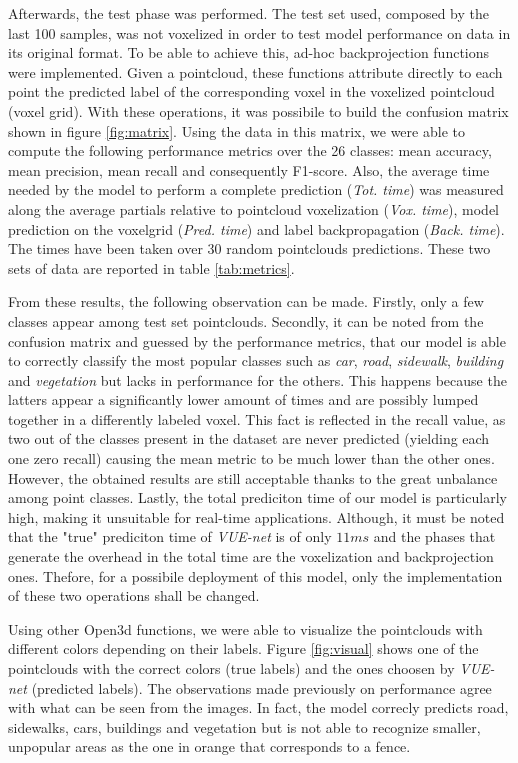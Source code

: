 Afterwards, the test phase was performed. The test set used, composed by the last 100 samples, 
was not voxelized in order to test model performance on data in its original format.
To be able to achieve this, ad-hoc backprojection functions were implemented.
Given a pointcloud, these functions attribute directly to each point the predicted label of the
corresponding voxel in the voxelized pointcloud (voxel grid).
With these operations, it was possibile to build the confusion matrix shown in figure \ref{fig:matrix}.
Using the data in this matrix, we were able to compute the following performance metrics over the 26 classes: 
mean accuracy, mean precision, mean recall and consequently F1-score.
Also, the average time needed by the model to perform a complete prediction (\textit{Tot. time}) was measured along the average partials relative to
pointcloud voxelization (\textit{Vox. time}), model prediction on the voxelgrid (\textit{Pred. time}) and
label backpropagation (\textit{Back. time}). The times have been taken over 30 random pointclouds predictions.
These two sets of data are reported in table \ref{tab:metrics}.

From these results, the following observation can be made.
Firstly, only a few classes appear among test set pointclouds.
Secondly, it can be noted from the confusion matrix and guessed by the performance metrics, 
that our model is able to correctly classify the most popular classes such as \textit{car},
\textit{road}, \textit{sidewalk}, \textit{building} and \textit{vegetation} 
but lacks in performance for the others. 
This happens because the latters appear a significantly lower amount of times and are possibly lumped together in a differently labeled voxel. 
This fact is reflected in the recall value, as two out of the classes present in the dataset 
are never predicted (yielding each one zero recall) causing the mean metric to be much lower than the other ones.
However, the obtained results are still acceptable thanks to the great unbalance among point classes.
Lastly, the total prediciton time of our model is particularly high,
making it unsuitable for real-time applications. Although, it must be noted that the "true" prediciton time
of \textit{VUE-net} is of only $11ms$ and the phases that generate the overhead in the total time
are the voxelization and backprojection ones. Thefore, for a possibile deployment of this model, only the 
implementation of these two operations shall be changed.

Using other Open3d functions, we were able to visualize the pointclouds with different colors depending
on their labels. Figure \ref{fig:visual} shows one of the pointclouds with the
correct colors (true labels) and the ones choosen by \textit{VUE-net} (predicted labels).
The observations made previously on performance agree with what can be seen from the images.
In fact, the model correcly predicts road, sidewalks, cars, buildings and vegetation but is not
able to recognize smaller, unpopular areas as the one in orange that corresponds to a fence.
